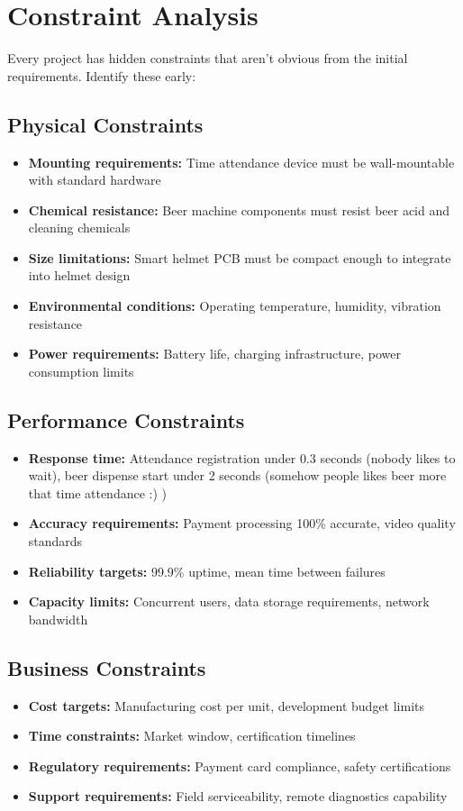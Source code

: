 \section{Constraint Analysis}

Every project has hidden constraints that aren't obvious from the initial requirements. Identify these early:

\subsection{Physical Constraints}
\begin{itemize}
\item \textbf{Mounting requirements:} Time attendance device must be wall-mountable with standard hardware
\item \textbf{Chemical resistance:} Beer machine components must resist beer acid and cleaning chemicals
\item \textbf{Size limitations:} Smart helmet PCB must be compact enough to integrate into helmet design
\item \textbf{Environmental conditions:} Operating temperature, humidity, vibration resistance
\item \textbf{Power requirements:} Battery life, charging infrastructure, power consumption limits
\end{itemize}

\subsection{Performance Constraints}
\begin{itemize}
\item \textbf{Response time:} Attendance registration under 0.3 seconds (nobody likes to wait), beer dispense start under 2 seconds (somehow people likes beer more that time attendance :) )
\item \textbf{Accuracy requirements:} Payment processing 100\% accurate, video quality standards
\item \textbf{Reliability targets:} 99.9\% uptime, mean time between failures
\item \textbf{Capacity limits:} Concurrent users, data storage requirements, network bandwidth
\end{itemize}

\subsection{Business Constraints}
\begin{itemize}
\item \textbf{Cost targets:} Manufacturing cost per unit, development budget limits
\item \textbf{Time constraints:} Market window, certification timelines
\item \textbf{Regulatory requirements:} Payment card compliance, safety certifications
\item \textbf{Support requirements:} Field serviceability, remote diagnostics capability
\end{itemize}

